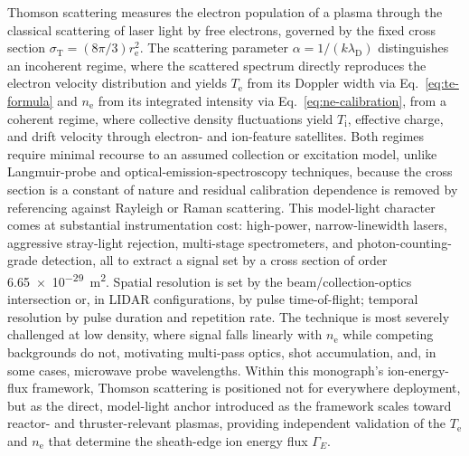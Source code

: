 Thomson scattering measures the electron population of a plasma through the classical scattering of laser light by free electrons, governed by the fixed cross section $\sigma_{\mathrm{T}} = (8\pi/3)r_{\mathrm{e}}^{2}$. The scattering parameter $\alpha = 1/(k\lambda_{\mathrm{D}})$ distinguishes an incoherent regime, where the scattered spectrum directly reproduces the electron velocity distribution and yields $T_{\mathrm{e}}$ from its Doppler width via Eq.~\eqref{eq:te-formula} and $n_{\mathrm{e}}$ from its integrated intensity via Eq.~\eqref{eq:ne-calibration}, from a coherent regime, where collective density fluctuations yield $T_{\mathrm{i}}$, effective charge, and drift velocity through electron- and ion-feature satellites. Both regimes require minimal recourse to an assumed collection or excitation model, unlike Langmuir-probe and optical-emission-spectroscopy techniques, because the cross section is a constant of nature and residual calibration dependence is removed by referencing against Rayleigh or Raman scattering. This model-light character comes at substantial instrumentation cost: high-power, narrow-linewidth lasers, aggressive stray-light rejection, multi-stage spectrometers, and photon-counting-grade detection, all to extract a signal set by a cross section of order \SI{6.65e-29}{\meter\squared}. Spatial resolution is set by the beam/collection-optics intersection or, in LIDAR configurations, by pulse time-of-flight; temporal resolution by pulse duration and repetition rate. The technique is most severely challenged at low density, where signal falls linearly with $n_{\mathrm{e}}$ while competing backgrounds do not, motivating multi-pass optics, shot accumulation, and, in some cases, microwave probe wavelengths. Within this monograph's ion-energy-flux framework, Thomson scattering is positioned not for everywhere deployment, but as the direct, model-light anchor introduced as the framework scales toward reactor- and thruster-relevant plasmas, providing independent validation of the $T_{\mathrm{e}}$ and $n_{\mathrm{e}}$ that determine the sheath-edge ion energy flux $\Gamma_{E}$.
